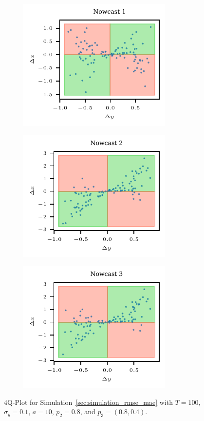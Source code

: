 \documentclass[oneside]{article}
\theoremstyle{plain}%
\theoremstyle{definition}
\begin{document}
\begin{figure}
  \centering
  \begin{subfigure}{.32\textwidth}
  	\includegraphics{plots/simulation_same_rmse_mae/4q_plot_1}
  \end{subfigure}
  \begin{subfigure}{.32\textwidth}
  	\includegraphics{plots/simulation_same_rmse_mae/4q_plot_2}
  \end{subfigure}
    \begin{subfigure}{.32\textwidth}
  	\includegraphics{plots/simulation_same_rmse_mae/4q_plot_3}
  \end{subfigure}
  \caption{4Q-Plot for Simulation~\ref{sec:simulation_rmse_mae} with $T = 100$, $\sigma_y=0.1$, $a = 10$, $p_2 = 0.8$, and $p_3 = (0.8, 0.4)$.}
  \label{fig:simulation_rmse_mae_4q}
\end{figure}
\end{document}
